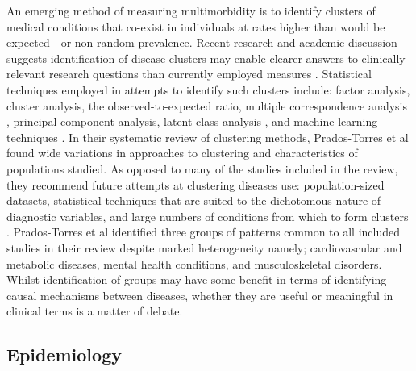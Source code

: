 \documentclass[12pt,]{report}
\begin{document}
An emerging method of measuring multimorbidity is to identify clusters
of medical conditions that co-exist in individuals at rates higher than
would be expected - or non-random prevalence. Recent research and
academic discussion suggests identification of disease clusters may
enable clearer answers to clinically relevant research questions than
currently employed measures
\citetext{\citealp{RN96}; \citealp[RN109;][]{RN98}; \citealp{RN99}; \citealp{RN188}; \citealp{RN31}; \citealp{RN64}}.
Statistical techniques employed in attempts to identify such clusters
include: factor analysis, cluster analysis, the observed-to-expected
ratio, multiple correspondence analysis \citep{RN98, RN301}, principal
component analysis, latent class analysis \citep{RN109, RN365}, and
machine learning techniques \citep{RN273}. In their systematic review of
clustering methods, Prados-Torres et al \citeyearpar{RN98} found wide
variations in approaches to clustering and characteristics of
populations studied. As opposed to many of the studies included in the
review, they recommend future attempts at clustering diseases use:
population-sized datasets, statistical techniques that are suited to the
dichotomous nature of diagnostic variables, and large numbers of
conditions from which to form clusters \citep{RN98}. Prados-Torres et al
\citeyearpar{RN98} identified three groups of patterns common to all
included studies in their review despite marked heterogeneity namely;
cardiovascular and metabolic diseases, mental health conditions, and
musculoskeletal disorders. Whilst identification of groups may have some
benefit in terms of identifying causal mechanisms between diseases,
whether they are useful or meaningful in clinical terms is a matter of
debate.

\subsection{Epidemiology}\label{subsec:mm-epi}
\end{document}
